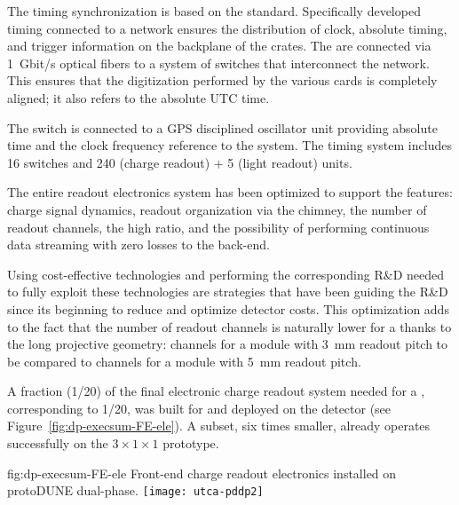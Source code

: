The timing synchronization is based on the  standard. Specifically developed timing  connected to a  network ensures the distribution of clock, absolute timing, and trigger information on the backplane of the  crates. The  are connected via \SI{1}{Gbit/s} optical fibers to a system of  switches that interconnect the  network. This ensures that the digitization performed by the various  cards is completely aligned; it also refers to the absolute UTC time. 

The  switch is connected to a GPS disciplined oscillator unit providing absolute time and the clock frequency reference to the system. The timing system includes \num{16}  switches and \num{240} (charge readout) + \num{5} (light readout)  units.    

The entire readout electronics system has been optimized to support the  features: charge signal dynamics, readout organization via the chimney, the number of readout channels, the high  ratio, and the possibility of performing continuous data streaming with zero losses to the  back-end. 

Using cost-effective technologies and performing the corresponding R\&D needed to fully exploit these technologies are strategies that have been guiding the R\&D since its beginning to reduce and optimize detector costs.   
This optimization adds to the fact that the number of readout channels is naturally lower for a  thanks to the long projective geometry: \dpnumcrpch channels for a  module with \SI{3}{mm} readout pitch to be compared to \spnumch channels for a  module with \SI{5}{mm} readout pitch. 

A fraction (1/20) of the final electronic charge readout system needed for a   , corresponding to 1/20, was built for  and deployed on the detector (see Figure~\ref{fig:dp-execsum-FE-ele}).  A subset, six times smaller, already operates successfully  on the $3\times 1 \times 1$ prototype.

\begin{dunefigure}{fig:dp-execsum-FE-ele}
  {Front-end charge readout electronics installed on protoDUNE dual-phase.}
  \texttt{[image: utca-pddp2]}
\end{dunefigure}


